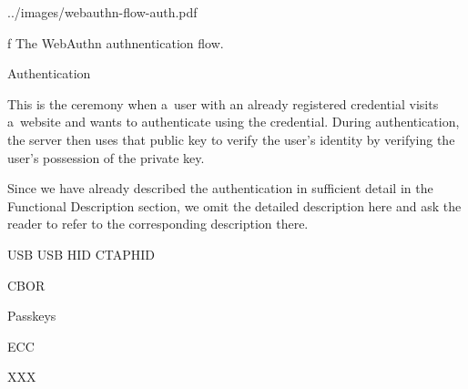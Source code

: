 \enditems

\midinsert
{}
\picw=12cm \cinspic ../images/webauthn-flow-auth.pdf
\caption/f The WebAuthn authnentication flow.
\endinsert


\secc Authentication

This is the ceremony when a~user with an already registered credential visits a~website and wants to authenticate using the credential. During authentication, the server then uses that {\sbf public key} to verify the user's identity by verifying the user's possession of the private key.


Since we have already described the authentication in sufficient detail in the Functional Description section, we omit the detailed description here and ask the reader to refer to the corresponding description there.

\sec USB
\sec USB HID
\sec CTAPHID

\sec CBOR

\sec Passkeys

\sec ECC

\sec XXX
